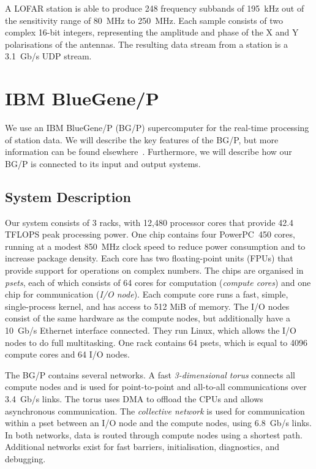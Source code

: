 \documentclass{llncs}
\begin{document}
A LOFAR station is able to produce 248 frequency subbands of 195~kHz out of the sensitivity range of 80~MHz to 250~MHz. Each sample consists of two complex 16-bit integers, representing the amplitude and phase of the X and Y polarisations of the antennas. The resulting data stream from a station is a 3.1~Gb/s UDP stream.


\section{IBM BlueGene/P}

We use an IBM BlueGene/P (BG/P) supercomputer for the real-time processing of station data. We will describe the key features of the BG/P, but more information can be found elsewhere~\cite{IBM:08}. Furthermore, we will describe how our BG/P is connected to its input and output systems.

\subsection{System Description}

Our system consists of 3 racks, with 12,480 processor cores that provide 42.4 TFLOPS peak processing power. One chip contains four PowerPC~450 cores, running at a modest 850~MHz clock speed to reduce power consumption and to increase package density. Each core has two floating-point units (FPUs) that provide support for operations on complex numbers. The chips are organised in \emph{psets}, each of which consists of 64 cores for computation (\emph{compute cores}) and one chip for communication (\emph{I/O node}). Each compute core runs a fast, simple, single-process kernel,  and has access to 512 MiB of memory. The I/O nodes consist of the same hardware as the compute nodes, but additionally have a 10~Gb/s Ethernet interface connected. They run Linux, which allows the I/O nodes to do full multitasking. One rack contains 64 psets, which is equal to 4096 compute cores and 64 I/O nodes.

The BG/P contains several networks. A fast \emph{3-dimensional torus\/} connects all compute nodes and is used for point-to-point and all-to-all communications over 3.4~Gb/s links. The torus uses DMA to offload the CPUs and allows asynchronous communication. The \emph{collective network\/} is used for communication within a pset between an I/O node and the compute nodes, using 6.8~Gb/s links. In both networks, data is routed through compute nodes using a shortest path. Additional networks exist for fast barriers, initialisation, diagnostics, and debugging.
\end{document}
